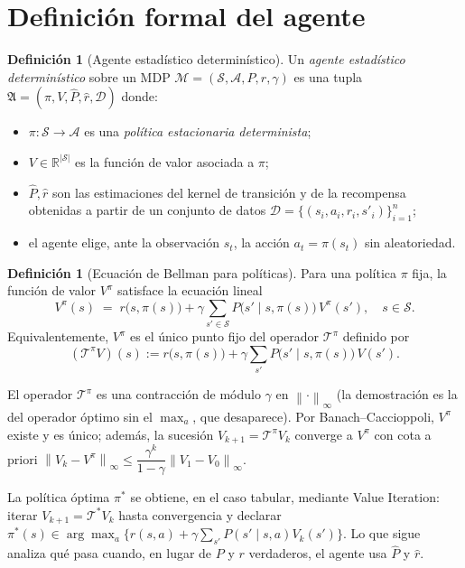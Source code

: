 \documentclass[12pt, a4paper]{article}
\theoremstyle{plain}
\theoremstyle{definition}
\newtheorem{definition}[theorem]{Definición}
\newcommand{\cT}{\mathcal{T}}
\newcommand{\cS}{\mathcal{S}}
\newcommand{\cA}{\mathcal{A}}
\newcommand{\cM}{\mathcal{M}}
\newcommand{\Vpi}{V^{\pi}}
\newcommand{\norminf}[1]{\left\|#1\right\|_{\infty}}
\newcommand{\R}{\mathbb{R}}
\newcommand{\Phat}{\widehat{P}}
\newcommand{\rhat}{\widehat{r}}
\begin{document}
\section{Definición formal del agente}
\label{sec:definicion}

\begin{definition}[Agente estadístico determinístico]
\label{def:agente}
Un \emph{agente estadístico determinístico} sobre un MDP
$\cM=(\cS,\cA,P,r,\gamma)$ es una tupla
$\mathfrak{A}=(\pi,V,\widehat{P},\widehat{r},\mathcal{D})$ donde:
\begin{itemize}[noitemsep]
  \item $\pi:\cS\to\cA$ es una \emph{política estacionaria determinista};
  \item $V\in\R^{|\cS|}$ es la función de valor asociada a $\pi$;
  \item $\widehat{P},\widehat{r}$ son las estimaciones del kernel de
        transición y de la recompensa obtenidas a partir de un conjunto
        de datos $\mathcal{D}=\{(s_i,a_i,r_i,s'_i)\}_{i=1}^{n}$;
  \item el agente elige, ante la observación $s_t$, la acción
        $a_t=\pi(s_t)$ sin aleatoriedad.
\end{itemize}
\end{definition}

\begin{definition}[Ecuación de Bellman para políticas]
\label{def:bellman-pi}
Para una política $\pi$ fija, la función de valor $V^{\pi}$ satisface la
ecuación lineal
\[
  \Vpi(s)
  \;=\; r\bigl(s,\pi(s)\bigr)
  +\gamma\sum_{s'\in\cS}P\bigl(s'\mid s,\pi(s)\bigr)\,\Vpi(s'),
  \quad s\in\cS.
\]
Equivalentemente, $\Vpi$ es el único punto fijo del operador
$\cT^{\pi}$ definido por
\[
  (\cT^{\pi}V)(s)
  := r\bigl(s,\pi(s)\bigr)
  +\gamma\sum_{s'}P\bigl(s'\mid s,\pi(s)\bigr)\,V(s').
\]
\end{definition}

El operador $\cT^{\pi}$ es una contracción de módulo $\gamma$ en
$\norminf{\cdot}$ (la demostración es la del operador óptimo sin el
$\max_a$, que desaparece). Por Banach--Caccioppoli, $\Vpi$ existe y es
único; además, la sucesión $V_{k+1}=\cT^{\pi}V_k$ converge a $\Vpi$ con
cota a priori
$\norminf{V_k-\Vpi}\leq\dfrac{\gamma^k}{1-\gamma}\norminf{V_1-V_0}$.

La política óptima $\pi^{*}$ se obtiene, en el caso tabular, mediante
Value Iteration: iterar $V_{k+1}=\cT^{*}V_k$ hasta convergencia y
declarar $\pi^{*}(s)\in\arg\max_a\{r(s,a)+\gamma\sum_{s'}P(s'\mid s,a)V_k(s')\}$.
Lo que sigue analiza qué pasa cuando, en lugar de $P$ y $r$ verdaderos,
el agente usa $\Phat$ y $\rhat$.
\end{document}
